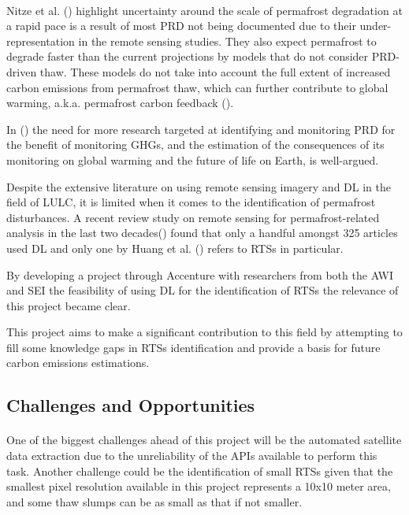 \paragraph{}
Nitze et al. (\cite{articleing2018}) highlight uncertainty around the scale of permafrost degradation at a rapid pace is a result of most \gls{PRD} not being documented due to their under-representation in the remote sensing studies. 
They also expect permafrost to degrade faster than the current projections by models that do not consider \gls{PRD}-driven thaw. These models do not take into account the full extent of increased carbon emissions from permafrost thaw, which can further contribute to global warming, \gls{a.k.a.} permafrost carbon feedback (\cite{articlecarbonfeedback}).

In (\cite{book1}) the need for more research targeted at identifying and monitoring \gls{PRD} for the benefit of monitoring \gls{GHGs}, and the estimation of the consequences of its monitoring on global warming and the future of life on Earth, is well-argued.

Despite the extensive literature on using remote sensing imagery and \gls{DL} in the field of \gls{LULC}, it is limited when it comes to the identification of permafrost disturbances.
A recent review study on remote sensing for permafrost-related analysis in the last two decades(\cite{rs13061217}) found that only a handful amongst 325 articles used \gls{DL} and only one by Huang et al. (\cite{HUANG2020111534}) refers to \gls{RTS}s in particular. 

By developing a project through Accenture with researchers from both the \gls{AWI} and \gls{SEI} the feasibility of using DL for the identification of \gls{RTS}s the relevance of this project became clear.

This project aims to make a significant contribution to this field by attempting to fill some knowledge gaps in \gls{RTS}s identification and provide a basis for future carbon emissions estimations.

\subsection{Challenges and Opportunities} \label{challenges}
\paragraph{}
One of the biggest challenges ahead of this project will be the automated satellite data extraction due to the unreliability of the \gls{API}s available to perform this task. Another challenge could be the identification of small \gls{RTS}s given that the smallest pixel resolution available in this project represents a 10x10 meter area, and some thaw slumps can be as small as that if not smaller.

